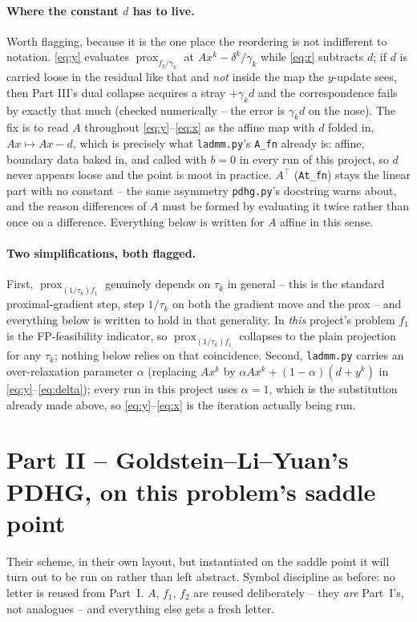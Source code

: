\documentclass[11pt]{article}
\newcommand{\code}[1]{\texttt{#1}}
\newcommand{\prox}{\operatorname{prox}}
\begin{document}
\paragraph{Where the constant $d$ has to live.}
Worth flagging, because it is the one place the reordering is not indifferent to
notation. \eqref{eq:y} evaluates $\prox_{f_2/\gamma_k}$ at $Ax^k-\delta^k/\gamma_k$
while \eqref{eq:r} subtracts $d$; if $d$ is carried loose in the residual like
that and \emph{not} inside the map the $y$-update sees, then Part III's dual
collapse acquires a stray $+\gamma_kd$ and the correspondence fails by exactly
that much (checked numerically -- the error is $\gamma_k d$ on the nose). The fix
is to read $A$ throughout \eqref{eq:y}--\eqref{eq:x} as the affine map with $d$
folded in, $Ax\mapsto Ax-d$, which is precisely what \code{ladmm.py}'s
\code{A\_fn} already is: affine, boundary data baked in, and called with $b=0$ in
every run of this project, so $d$ never appears loose and the point is moot in
practice. $A^\top$ (\code{At\_fn}) stays the linear part with no constant -- the
same asymmetry \code{pdhg.py}'s docstring warns about, and the reason differences
of $A$ must be formed by evaluating it twice rather than once on a difference.
Everything below is written for $A$ affine in this sense.

\paragraph{Two simplifications, both flagged.}
First, $\prox_{(1/\tau_k)f_1}$ genuinely depends on $\tau_k$ in general -- this is
the standard proximal-gradient step, step $1/\tau_k$ on both the gradient move and
the prox -- and everything below is written to hold in that generality. In
\emph{this} project's problem $f_1$ is the FP-feasibility indicator, so
$\prox_{(1/\tau_k)f_1}$ collapses to the plain projection for any $\tau_k$;
nothing below relies on that coincidence. Second, \code{ladmm.py} carries an
over-relaxation parameter $\alpha$ (replacing $Ax^{k}$ by
$\alpha Ax^{k}+(1-\alpha)(d+y^{k})$ in \eqref{eq:y}--\eqref{eq:delta}); every run
in this project uses $\alpha=1$, which is the substitution already made above, so
\eqref{eq:y}--\eqref{eq:x} is the iteration actually being run.


\section*{Part II -- Goldstein--Li--Yuan's PDHG, on this problem's saddle point}
Their scheme, in their own layout, but instantiated on the saddle point it will
turn out to be run on rather than left abstract. Symbol discipline as before: no
letter is reused from Part~I. $A$, $f_1$, $f_2$ are reused deliberately -- they
\emph{are} Part~I's, not analogues -- and everything else gets a fresh letter.
\end{document}
